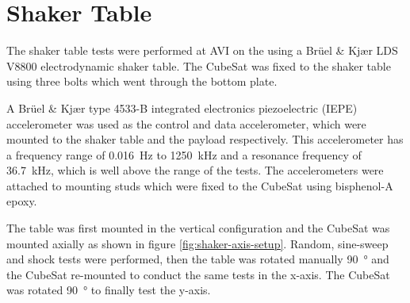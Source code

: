 \documentclass{report}
\begin{document}
\section{Shaker Table}
\label{sec:shaker-table-method}

The shaker table tests were performed at AVI on the  using a Brüel \& Kjær LDS V8800 electrodynamic shaker table. The CubeSat was fixed to the shaker table using three bolts which went through the bottom plate.

A Brüel \& Kjær type 4533-B integrated electronics piezoelectric (IEPE) accelerometer was used as the control and data accelerometer, which were mounted to the shaker table and the payload respectively. This accelerometer has a frequency range of \SI{0.016}{\hertz} to \SI{1250}{\kilo\hertz} and a resonance frequency of \SI{36.7}{\kilo\hertz}, which is well above the range of the tests. The accelerometers were attached to mounting studs which were fixed to the CubeSat using bisphenol-A epoxy.

The table was first mounted in the vertical configuration and the CubeSat was mounted axially as shown in figure \ref{fig:shaker-axis-setup}. Random, sine-sweep and shock tests were performed, then the table was rotated manually \SI{90}{\degree} and the CubeSat re-mounted to conduct the same tests in the x-axis. The CubeSat was rotated \SI{90}{\degree} to finally test the y-axis.
\end{document}

